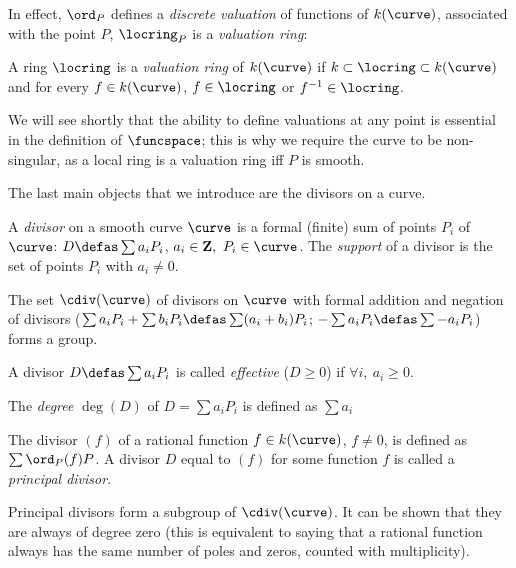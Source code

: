 In effect, $\ord_P$ defines a \emph{discrete valuation} of functions of $k(\curve)$, associated with the point $P$, \ie $\locring_P$ is a \emph{valuation ring}:

\begin{defi}
A ring $\locring$ is a \emph{valuation ring} of $k(\curve)$ if $k \subset \locring \subset k(\curve)$  and for every $f \in k(\curve)$,
$f \in \locring$ or $f^{-1} \in \locring$.
\end{defi}

We will see shortly that the ability to define valuations at any point is essential
in the definition of $\funcspace$; this is why we require the curve to be non-singular, as a local ring is a valuation ring iff $P$ is smooth.

\medskip

The last main objects that we introduce are the divisors on a curve.

\begin{defi}[Divisor]
A \emph{divisor} on a smooth curve $\curve$ is a formal (finite) sum of points $P_i$ of $\curve$: $D \defas \sum a_iP_i$, $a_i \in \mathbf{Z},~P_i \in \curve$.
The \emph{support} of a divisor is the set of points $P_i$ with $a_i \neq 0$.

\noindent
The set $\cdiv(\curve)$ of divisors on $\curve$ with formal addition and negation of divisors ($\sum a_iP_i + \sum b_iP_i \defas \sum (a_i+b_i)P_i$;
$-\sum a_iP_i \defas \sum -a_iP_i$) forms a group.

\noindent
A divisor $D \defas \sum a_iP_i$ is called \emph{effective} ($D \geq 0$) if $\forall i,~a_i \geq 0$.

\noindent
The \emph{degree} $\deg(D)$ of $D = \sum a_iP_i$ is defined as $\sum a_i$
\end{defi}

\begin{defi}
The divisor $(f)$ of a rational function $f \in k(\curve)$, $f \neq 0$, is defined as $\sum \ord_P(f)P$.
A divisor $D$ equal to $(f)$ for some function $f$ is called a \emph{principal divisor}.
\end{defi}

Principal divisors form a subgroup of $\cdiv(\curve)$. It can be shown that they are always of degree zero
(this is equivalent to saying that a rational function always has the same number of poles and zeros, counted with
multiplicity).

